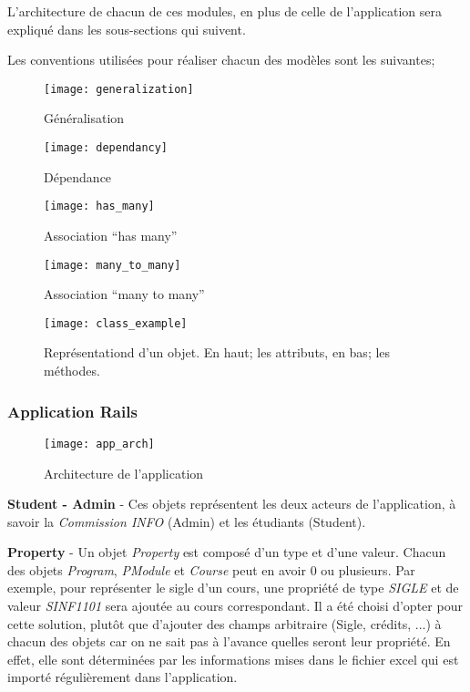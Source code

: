 L'architecture de chacun de ces modules, en plus de celle de l'application sera expliqué dans les sous-sections qui suivent.

Les conventions utilisées pour réaliser chacun des modèles sont les suivantes; 

\begin{figure}[H]
\centering
\caption{Généralisation}
\label{fig:generalization}
\texttt{[image: generalization]}
\end{figure}

\begin{figure}[H]
\centering
\caption{Dépendance}
\label{fig:dependancy}
\texttt{[image: dependancy]}
\end{figure}

\begin{figure}[H]
\centering
\caption{Association ``has many''}
\label{fig:has_many}
\texttt{[image: has\_many]}
\end{figure}

\begin{figure}[H]
\centering
\caption{Association ``many to many''}
\label{fig:many_to_many}
\texttt{[image: many\_to\_many]}
\end{figure}

\begin{figure}[H]
\centering
\caption{Représentationd d'un objet. En haut; les attributs, en bas; les méthodes.}
\label{fig:class_example}
\texttt{[image: class\_example]}
\end{figure}



\subsubsection{Application Rails}
\label{arch}
\begin{figure}[H]
\centering
\caption{Architecture de l'application}
\label{fig:app_arch}
\texttt{[image: app\_arch]}
\end{figure}

\textbf{Student - Admin} - Ces objets représentent les deux acteurs de l'application, à savoir la \textit{Commission INFO} (Admin) et les étudiants (Student).

\textbf{Property} - Un objet \textit{Property} est composé d'un type et d'une valeur. Chacun des objets \textit{Program}, \textit{PModule} et \textit{Course} peut en avoir 0 ou plusieurs. Par exemple, pour représenter le sigle d'un cours, une propriété de type \textit{SIGLE} et de valeur \textit{SINF1101} sera ajoutée au cours correspondant. Il a été choisi d'opter pour cette solution, plutôt que d'ajouter des champs arbitraire (Sigle, crédits, ...) à chacun des objets car on ne sait pas à l'avance quelles seront leur propriété. En effet, elle sont déterminées par les informations mises dans le fichier excel qui est importé régulièrement dans l'application. 

